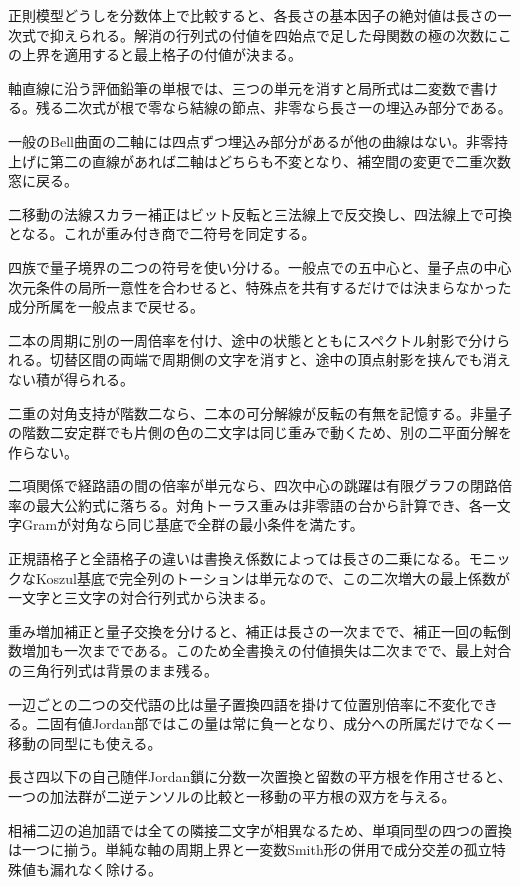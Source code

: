 \documentclass[11pt,a4paper]{ltjsarticle}
\begin{document}
正則模型どうしを分数体上で比較すると、各長さの基本因子の絶対値は長さの一次式で抑えられる。解消の行列式の付値を四始点で足した母関数の極の次数にこの上界を適用すると最上格子の付値が決まる。

軸直線に沿う評価鉛筆の単根では、三つの単元を消すと局所式は二変数で書ける。残る二次式が根で零なら結線の節点、非零なら長さ一の埋込み部分である。

一般のBell曲面の二軸には四点ずつ埋込み部分があるが他の曲線はない。非零持上げに第二の直線があれば二軸はどちらも不変となり、補空間の変更で二重次数窓に戻る。

二移動の法線スカラー補正はビット反転と三法線上で反交換し、四法線上で可換となる。これが重み付き商で二符号を同定する。

四族で量子境界の二つの符号を使い分ける。一般点での五中心と、量子点の中心次元条件の局所一意性を合わせると、特殊点を共有するだけでは決まらなかった成分所属を一般点まで戻せる。

二本の周期に別の一周倍率を付け、途中の状態とともにスペクトル射影で分けられる。切替区間の両端で周期側の文字を消すと、途中の頂点射影を挟んでも消えない積が得られる。

二重の対角支持が階数二なら、二本の可分解線が反転の有無を記憶する。非量子の階数二安定群でも片側の色の二文字は同じ重みで動くため、別の二平面分解を作らない。

二項関係で経路語の間の倍率が単元なら、四次中心の跳躍は有限グラフの閉路倍率の最大公約式に落ちる。対角トーラス重みは非零語の台から計算でき、各一文字Gramが対角なら同じ基底で全群の最小条件を満たす。

正規語格子と全語格子の違いは書換え係数によっては長さの二乗になる。モニックなKoszul基底で完全列のトーションは単元なので、この二次増大の最上係数が一文字と三文字の対合行列式から決まる。

重み増加補正と量子交換を分けると、補正は長さの一次までで、補正一回の転倒数増加も一次までである。このため全書換えの付値損失は二次までで、最上対合の三角行列式は背景のまま残る。

一辺ごとの二つの交代語の比は量子置換四語を掛けて位置別倍率に不変化できる。二固有値Jordan部ではこの量は常に負一となり、成分への所属だけでなく一移動の同型にも使える。

長さ四以下の自己随伴Jordan鎖に分数一次置換と留数の平方根を作用させると、一つの加法群が二逆テンソルの比較と一移動の平方根の双方を与える。

相補二辺の追加語では全ての隣接二文字が相異なるため、単項同型の四つの置換は一つに揃う。単純な軸の周期上界と一変数Smith形の併用で成分交差の孤立特殊値も漏れなく除ける。
\end{document}
